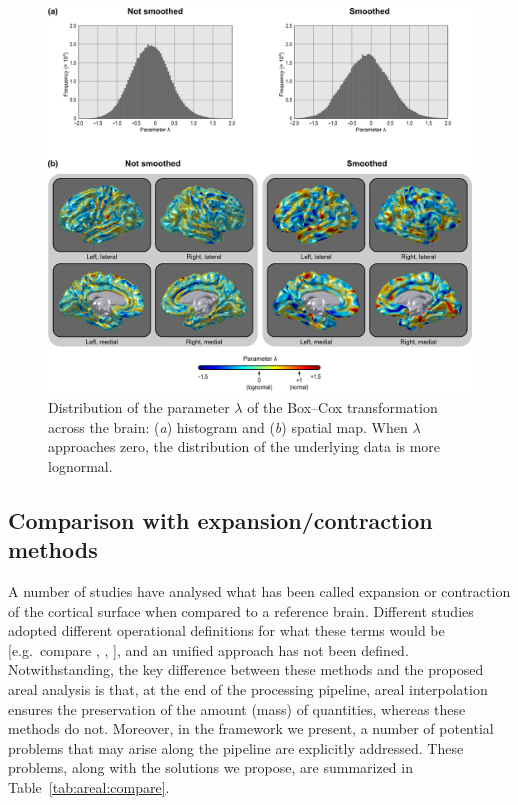 \begin{figure}[!p]  %
\centering
\includegraphics[width=14cm]{images/boxcox.png}
\caption[Spatial distribution of the parameter $\lambda$.]{Distribution of the parameter $\lambda$ of the Box--Cox transformation across the brain: (\emph{a}) histogram and (\emph{b}) spatial map. When $\lambda$ approaches zero, the distribution of the underlying data is more lognormal.}
\label{fig:areal:boxcox}
\end{figure}

\subsection{Comparison with expansion/contraction methods}

A number of studies have analysed what has been called expansion or contraction of the cortical surface when compared to a reference brain. Different studies adopted different operational definitions for what these terms would be [e.g.\ compare \citet{Joyner2009}, \citet{Sun2009}, \citet{Hill2010}], and an unified approach has not been defined. Notwithstanding, the key difference between these methods and the proposed areal analysis is that, at the end of the processing pipeline, areal interpolation ensures the preservation of the amount (mass) of quantities, whereas these methods do not. Moreover, in the framework we present, a number of potential problems that may arise along the pipeline are explicitly addressed. These problems, along with the solutions we propose, are summarized in Table~\ref{tab:areal:compare}.

